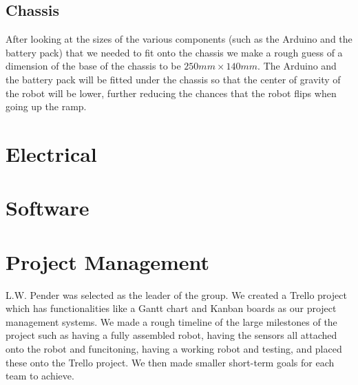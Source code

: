 \documentclass{article}
\begin{document}
\subsection{Chassis}
\quad After looking at the sizes of the various components (such as the Arduino and the battery pack) that we needed to fit onto the chassis we make a rough guess of a dimension of the base of the chassis to be $250mm \times 140mm$. The Arduino and the battery pack will be fitted under the chassis so that the center of gravity of the robot will be lower, further reducing the chances that the robot flips when going up the ramp.

\section{Electrical}



\section{Software}


\section{Project Management}
\quad L.W. Pender was selected as the leader of the group. We created a Trello project which has functionalities like a Gantt chart and Kanban boards as our project management systems. We made a rough timeline of the large milestones of the project such as having a fully assembled robot, having the sensors all attached onto the robot and funcitoning, having a working robot and testing, and placed these onto the Trello project. We then made smaller short-term goals for each team to achieve.
\end{document}
